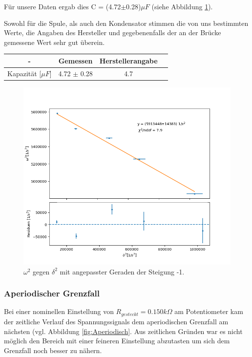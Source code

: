 \documentclass[12pt,a4paper]{article}
\begin{document}
Für unsere Daten ergab dies C = (4.72$\pm$0.28)$\mu F$ (siehe Abbildung \ref{pic:fit_C_RLC}).

Sowohl für die Spule, als auch den Kondensator stimmen die von uns bestimmten Werte, die Angaben des Hersteller und gegebenenfalls der an der Brücke gemessene Wert sehr gut überein.


\begin{table}[H]
	\centering
	\begin{tabular}{|c|c|c|c|}
		\hline
		- & \textbf{Gemessen} & \textbf{Herstellerangabe} \\
		\hline
		Kapazität [$\mu F$] & 4.72 $\pm$ 0.28 & 4.7 \\
		\hline
	\end{tabular}
\end{table}

\begin{figure}
	\centering
	\includegraphics[width=0.8\linewidth]{Bilder/fit_C_RLC}
	\caption{$\omega^2$ gegen $\delta^2$ mit angepasster Geraden der Steigung -1.}
	\label{pic:fit_C_RLC}
\end{figure}


\subsubsection{Aperiodischer Grenzfall}
Bei einer nominellen Einstellung von $R_{gesteckt}=0.150k\Omega$ am Potentiometer kam der zeitliche Verlauf des Spannungssignals dem aperiodischen Grenzfall am nächsten (vgl. Abbildung \ref{fig:Aperiodisch}. Aus zeitlichen Gründen war es nicht möglich den Bereich mit einer feineren Einstellung abzutasten um sich dem Grenzfall noch besser zu nähern.\\
\end{document}
